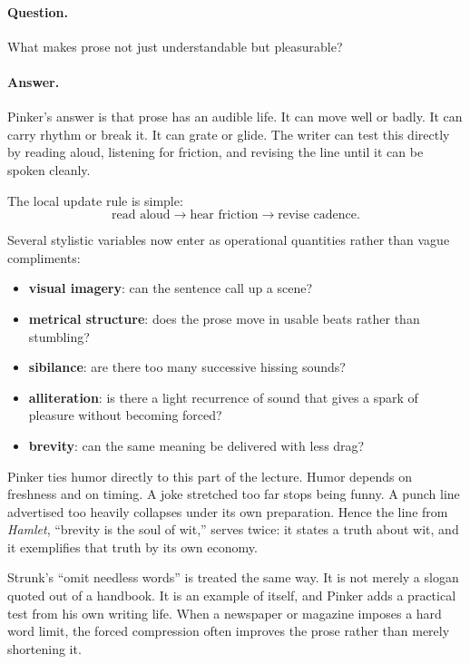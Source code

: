 \paragraph{Question.} What makes prose not just understandable but pleasurable?

\paragraph{Answer.} Pinker's answer is that prose has an audible life. It can move well or badly. It can carry rhythm or break it. It can grate or glide. The writer can test this directly by reading aloud, listening for friction, and revising the line until it can be spoken cleanly.

The local update rule is simple:
\begin{equation}
\text{read aloud} \to \text{hear friction} \to \text{revise cadence}.
\end{equation}

Several stylistic variables now enter as operational quantities rather than vague compliments:
\begin{itemize}
\item \textbf{visual imagery}: can the sentence call up a scene?
\item \textbf{metrical structure}: does the prose move in usable beats rather than stumbling?
\item \textbf{sibilance}: are there too many successive hissing sounds?
\item \textbf{alliteration}: is there a light recurrence of sound that gives a spark of pleasure without becoming forced?
\item \textbf{brevity}: can the same meaning be delivered with less drag?
\end{itemize}

Pinker ties humor directly to this part of the lecture. Humor depends on freshness and on timing. A joke stretched too far stops being funny. A punch line advertised too heavily collapses under its own preparation. Hence the line from \emph{Hamlet}, ``brevity is the soul of wit,'' serves twice: it states a truth about wit, and it exemplifies that truth by its own economy.

Strunk's ``omit needless words'' is treated the same way. It is not merely a slogan quoted out of a handbook. It is an example of itself, and Pinker adds a practical test from his own writing life. When a newspaper or magazine imposes a hard word limit, the forced compression often improves the prose rather than merely shortening it.

